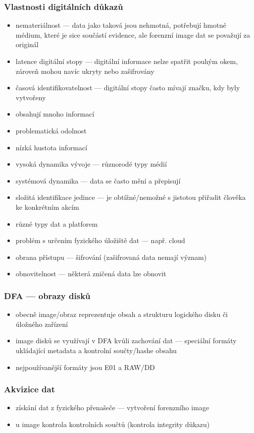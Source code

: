 \subsubsection*{Vlastnosti digitálních důkazů}
\begin{itemize}
	\item nemateriálnost --- data jako taková jsou nehmotná, potřebují hmotné médium, které je sice součástí evidence, ale forenzní image dat se považují za originál
	\item latence digitální stopy --- digitální informace nelze spatřit pouhým okem, zároveň mohou navíc ukryty nebo zašifrovány
	\item časová identifikovatelnost --- digitální stopy často mívají značku, kdy byly vytvořeny
	\item obsahují mnoho informací
	\item problematická odolnost
	\item nízká hustota informací
	\item vysoká dynamika vývoje --- různorodé typy médií
	\item systémová dynamika --- data se často mění a přepisují
	\item složitá identifikace jedince --- je obtížné/nemožné s jistotou přiřadit člověka ke konkrétním akcím
	\item různé typy dat a platforem
	\item problém s určením fyzického úložiště dat --- např. cloud
	\item obrana přístupu --- šifrování (zašifrovaná data nemají význam)
	\item obnovitelnost --- některá zničená data lze obnovit
\end{itemize}

\subsubsection*{DFA --- obrazy disků}
\begin{itemize}
	\item obecně image/obraz reprezentuje obsah a strukturu logického disku či úložného zařízení
	\item image disků se využívají v DFA kvůli zachování dat --- speciální formáty ukládající metadata a kontrolní součty/hashe obsahu
	\item nejpoužívanější formáty jsou E01 a RAW/DD
\end{itemize}

\subsubsection*{Akvizice dat}
\begin{itemize}
	\item získání dat z fyzického přenašeče --- vytvoření forenzního image
	\item u image kontrola kontrolních součtů (kontrola integrity důkazu)
\end{itemize}